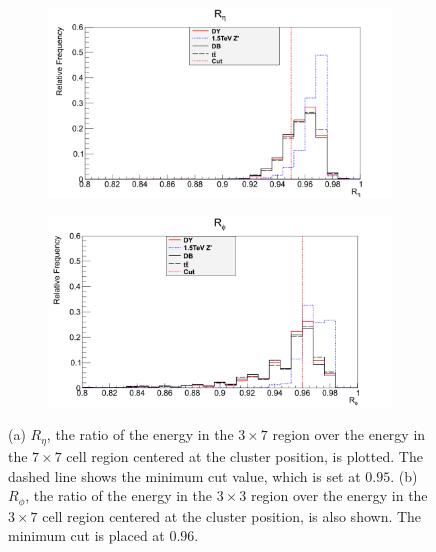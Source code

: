 \documentclass{article}
\begin{document}
\begin{figure}[h]
    \centering
    \begin{subfigure}{.49\textwidth}
        \includegraphics[height=0.6\textwidth]{images/variables/rEta.png}
        \caption{}
        \label{fig:rEta}
    \end{subfigure}
    \begin{subfigure}{.49\textwidth}
        \includegraphics[height=0.6\textwidth]{images/variables/rPhi.png}
        \caption{}
        \label{fig:rPhi}
    \end{subfigure}
    \caption{ (a) $R_{\eta}$, the ratio of the energy in the $3\times7$ region over the energy in the $7\times7$ cell region centered at the cluster position, is plotted. The dashed line shows the minimum cut value, which is set at $0.95$. (b) $R_{\phi}$, the ratio of the energy in the $3\times3$ region over the energy in the $3\times7$ cell region centered at the cluster position, is also shown. The minimum cut is placed at $0.96$. \label{fig:rEtaRPhi}}
\end{figure}
\end{document}

